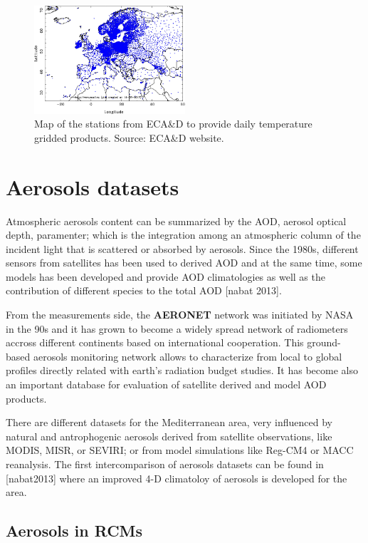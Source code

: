 \begin{figure}
\centering
\includegraphics[width=0.5\textwidth]{figs/all_stations_plot.png}
\caption{Map of the stations from ECA\&D to provide daily temperature gridded products. Source: ECA\&D website.}
\label{fig:ecad}
\end{figure}

\section{Aerosols datasets}

Atmospheric aerosols content can be summarized by the AOD, aerosol optical depth, paramenter; which is the integration among an atmospheric column of the incident light that is scattered or absorbed by aerosols. Since the 1980s, different sensors from satellites has been used to derived AOD and at the same time, some models has been developed and provide AOD climatologies as well as the contribution of different species to the total AOD [nabat 2013].

From the measurements side, the \textbf{AERONET} network \cite*{Holben1998} was initiated by NASA in the 90s and it has grown to become a widely spread network of radiometers accross different continents based on international cooperation. This ground-based aerosols monitoring network allows to characterize from local to global profiles directly related with earth's radiation budget studies. It has become also an important database for evaluation of satellite derived and model AOD products.

There are different datasets for the Mediterranean area, very influenced by natural and antrophogenic aerosols derived from satellite observations, like MODIS, MISR, or SEVIRI; or from model simulations like Reg-CM4 or MACC reanalysis. The first intercomparison of aerosols datasets can be found in [nabat2013] where an improved 4-D climatoloy of aerosols is developed for the area.

\subsection{Aerosols in RCMs}

